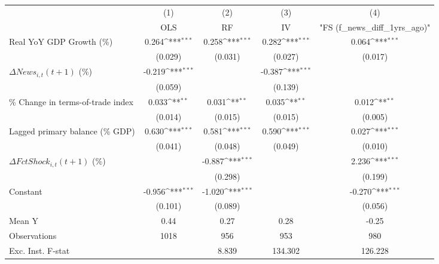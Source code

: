 {
\def\sym#1{\ifmmode^{#1}\else\(^{#1}\)\fi}
\begin{tabular}{l*{4}{c}}
\toprule
                    &\multicolumn{1}{c}{(1)}&\multicolumn{1}{c}{(2)}&\multicolumn{1}{c}{(3)}&\multicolumn{1}{c}{(4)}\\
                    &\multicolumn{1}{c}{OLS}&\multicolumn{1}{c}{RF}&\multicolumn{1}{c}{IV}&\multicolumn{1}{c}{ "FS (f_news_diff_1yrs_ago)" }\\
\midrule
Real YoY GDP Growth (\%)&       0.264\sym{***}&       0.258\sym{***}&       0.282\sym{***}&       0.064\sym{***}\\
                    &     (0.029)         &     (0.031)         &     (0.027)         &     (0.017)         \\
\addlinespace
$ \Delta News_{i,t}(t+1)$ (\%)&      -0.219\sym{***}&                     &      -0.387\sym{***}&                     \\
                    &     (0.059)         &                     &     (0.139)         &                     \\
\addlinespace
\% Change in terms-of-trade index&       0.033\sym{**} &       0.031\sym{**} &       0.035\sym{**} &       0.012\sym{**} \\
                    &     (0.014)         &     (0.015)         &     (0.015)         &     (0.005)         \\
\addlinespace
Lagged primary balance (\% GDP)&       0.630\sym{***}&       0.581\sym{***}&       0.590\sym{***}&       0.027\sym{***}\\
                    &     (0.041)         &     (0.048)         &     (0.049)         &     (0.010)         \\
\addlinespace
$ \Delta FctShock_{i,t}(t+1)$ (\%)&                     &      -0.887\sym{***}&                     &       2.236\sym{***}\\
                    &                     &     (0.298)         &                     &     (0.199)         \\
\addlinespace
Constant            &      -0.956\sym{***}&      -1.020\sym{***}&                     &      -0.270\sym{***}\\
                    &     (0.101)         &     (0.089)         &                     &     (0.056)         \\
\midrule
Mean Y              &        0.44         &        0.27         &        0.28         &       -0.25         \\
Observations        &        1018         &         956         &         953         &         980         \\
Exc. Inst. F-stat   &                     &       8.839         &     134.302         &     126.228         \\
\bottomrule
\end{tabular}
}
